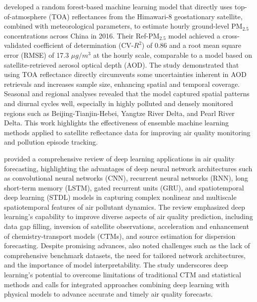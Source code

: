 \documentclass[11pt]{article}
\begin{document}
\citet{liu2019satellite} developed a random forest-based machine learning model that directly uses top-of-atmosphere (TOA) reflectances from the Himawari-8 geostationary satellite, combined with meteorological parameters, to estimate hourly ground-level PM$_{2.5}$ concentrations across China in 2016. Their Ref-PM$_{2.5}$ model achieved a cross-validated coefficient of determination (CV-$R^2$) of 0.86 and a root mean square error (RMSE) of 17.3 \(\mu g/m^{3}\) at the hourly scale, comparable to a model based on satellite-retrieved aerosol optical depth (AOD). The study demonstrated that using TOA reflectance directly circumvents some uncertainties inherent in AOD retrievals and increases sample size, enhancing spatial and temporal coverage. Seasonal and regional analyses revealed that the model captured spatial patterns and diurnal cycles well, especially in highly polluted and densely monitored regions such as Beijing-Tianjin-Hebei, Yangtze River Delta, and Pearl River Delta. This work highlights the effectiveness of ensemble machine learning methods applied to satellite reflectance data for improving air quality monitoring and pollution episode tracking.

\citet{liao2020deep} provided a comprehensive review of deep learning applications in air quality forecasting, highlighting the advantages of deep neural network architectures such as convolutional neural networks (CNN), recurrent neural networks (RNN), long short-term memory (LSTM), gated recurrent units (GRU), and spatiotemporal deep learning (STDL) models in capturing complex nonlinear and multiscale spatiotemporal features of air pollutant dynamics. The review emphasized deep learning’s capability to improve diverse aspects of air quality prediction, including data gap filling, inversion of satellite observations, acceleration and enhancement of chemistry-transport models (CTMs), and source estimation for dispersion forecasting. Despite promising advances, \citet{liao2020deep} also noted challenges such as the lack of comprehensive benchmark datasets, the need for tailored network architectures, and the importance of model interpretability. The study underscores deep learning’s potential to overcome limitations of traditional CTM and statistical methods and calls for integrated approaches combining deep learning with physical models to advance accurate and timely air quality forecasts.
\end{document}
